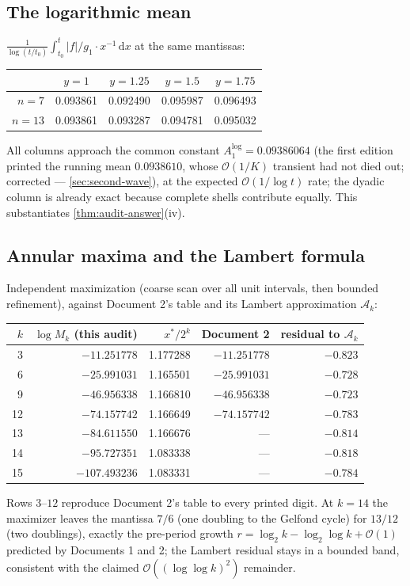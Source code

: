 \documentclass[11pt,oneside]{article}
\theoremstyle{definition}
\theoremstyle{remark}
\newcommand{\dd}{\,\mathrm d}
\newcommand{\bigO}{\mathcal O}
\begin{document}
\subsection{The logarithmic mean}
\label{ssec:logmean}

$\frac{1}{\log(t/t_0)}\int_{t_0}^{t}|f|/g_1\cdot x^{-1}\dd x$ at the same
mantissas:
\begin{center}
\small
\begin{tabular}{@{}rcccc@{}}
\toprule
 & $y=1$ & $y=1.25$ & $y=1.5$ & $y=1.75$\\
\midrule
$n=7$  & 0.093861 & 0.092490 & 0.095987 & 0.096493\\
$n=13$ & 0.093861 & 0.093287 & 0.094781 & 0.095032\\
\bottomrule
\end{tabular}
\end{center}
All columns approach the common constant
$A_1^{\log}=0.09386064$ (the first edition printed the running mean
$0.0938610$, whose $\bigO(1/K)$ transient had not died out;
corrected --- \cref{sec:second-wave}), at the
expected $\bigO(1/\log t)$ rate; the dyadic column is already exact
because complete shells contribute equally.  This substantiates
\cref{thm:audit-answer}(iv).

\subsection{Annular maxima and the Lambert formula}
\label{ssec:maxima}

Independent maximization (coarse scan over all unit intervals, then
bounded refinement), against Document 2's table and its Lambert
approximation $\mathcal A_k$:
\begin{center}
\small
\begin{tabular}{@{}rrrrr@{}}
\toprule
$k$ & $\log M_k$ (this audit) & $x^*/2^k$ & Document 2 & residual to
$\mathcal A_k$\\
\midrule
3  & $-11.251778$ & 1.177288 & $-11.251778$ & $-0.823$\\
6  & $-25.991031$ & 1.165501 & $-25.991031$ & $-0.728$\\
9  & $-46.956338$ & 1.166810 & $-46.956338$ & $-0.723$\\
12 & $-74.157742$ & 1.166649 & $-74.157742$ & $-0.783$\\
13 & $-84.611550$ & 1.166676 & --- & $-0.814$\\
14 & $-95.727351$ & 1.083338 & --- & $-0.818$\\
15 & $-107.493236$ & 1.083331 & --- & $-0.784$\\
\bottomrule
\end{tabular}
\end{center}
Rows $3$--$12$ reproduce Document 2's table to every printed digit.  At
$k=14$ the maximizer leaves the mantissa $7/6$ (one doubling to the
Gelfond cycle) for $13/12$ (two doublings), exactly the pre-period growth
$r=\log_2k-\log_2\log k+\bigO(1)$ predicted by Documents 1 and 2; the
Lambert residual stays in a bounded band, consistent with the claimed
$\bigO((\log\log k)^2)$ remainder.
\end{document}
